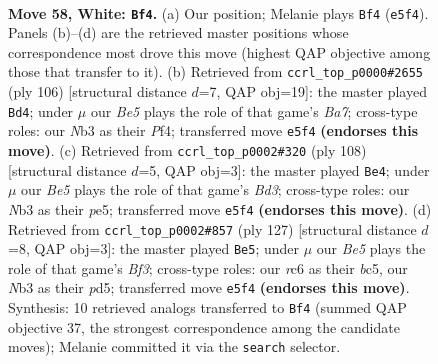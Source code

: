 \documentclass[11pt]{article}
\begin{document}
\clearpage

\begin{figure}[p]\centering
\begin{subfigure}{0.46\textwidth}\centering
\resizebox{\linewidth}{!}{%
\newchessgame
\chessboard[
  setfen={5k2/2P5/2r5/4B3/8/1N6/5K2/8 w - - 29 58},
  showmover=false,
  pgfstyle=straightmove, color=movearrow, markmove={e5-f4}
]}
\caption{}
\end{subfigure}\hfill
\begin{subfigure}{0.46\textwidth}\centering
\resizebox{\linewidth}{!}{%
\newchessgame
\chessboard[
  setfen={8/B7/8/1k6/5PK1/3P4/3r4/8 w - - 2 54},
  showmover=false,
  pgfstyle=straightmove, color=movearrow, markmove={a7-d4}
]}
\caption{}
\end{subfigure}
\\[4pt]
\begin{subfigure}{0.46\textwidth}\centering
\resizebox{\linewidth}{!}{%
\newchessgame
\chessboard[
  setfen={8/2k5/P7/2K1p3/8/3B4/8/r7 w - - 3 55},
  showmover=false,
  pgfstyle=straightmove, color=movearrow, markmove={d3-e4}
]}
\caption{}
\end{subfigure}\hfill
\begin{subfigure}{0.46\textwidth}\centering
\resizebox{\linewidth}{!}{%
\newchessgame
\chessboard[
  setfen={4k3/8/5b2/2BP3K/7p/8/8/8 b - - 18 64},
  showmover=false,
  pgfstyle=straightmove, color=movearrow, markmove={f6-e5}
]}
\caption{}
\end{subfigure}
\caption{\textbf{Move 58, White: \texttt{Bf4}.} (a) Our position; Melanie plays \texttt{Bf4} (\texttt{e5f4}). Panels (b)--(d) are the retrieved master positions whose correspondence most drove this move (highest QAP objective among those that transfer to it). (b) Retrieved from \texttt{ccrl\_top\_p0000\#2655} (ply 106) [structural distance $d$=7, QAP obj=19]: the master played \texttt{Bd4}; under $\mu$ our \emph{Be5} plays the role of that game's \emph{Ba7}; cross-type roles: our \emph{N}b3 as their \emph{P}f4; transferred move \texttt{e5f4} \textbf{(endorses this move)}. (c) Retrieved from \texttt{ccrl\_top\_p0002\#320} (ply 108) [structural distance $d$=5, QAP obj=3]: the master played \texttt{Be4}; under $\mu$ our \emph{Be5} plays the role of that game's \emph{Bd3}; cross-type roles: our \emph{N}b3 as their \emph{p}e5; transferred move \texttt{e5f4} \textbf{(endorses this move)}. (d) Retrieved from \texttt{ccrl\_top\_p0002\#857} (ply 127) [structural distance $d$=8, QAP obj=3]: the master played \texttt{Be5}; under $\mu$ our \emph{Be5} plays the role of that game's \emph{Bf3}; cross-type roles: our \emph{r}c6 as their \emph{b}c5, our \emph{N}b3 as their \emph{p}d5; transferred move \texttt{e5f4} \textbf{(endorses this move)}. Synthesis: 10 retrieved analogs transferred to \texttt{Bf4} (summed QAP objective 37, the strongest correspondence among the candidate moves); Melanie committed it via the \texttt{search} selector.}
\label{fig:thought-m114}
\end{figure}
\end{document}
